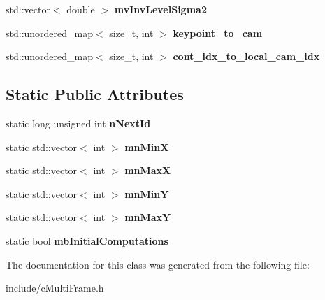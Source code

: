 \begin{DoxyCompactItemize}
\item 
std\+::vector$<$ double $>$ {\bfseries mv\+Inv\+Level\+Sigma2}\hypertarget{classMultiColSLAM_1_1cMultiFrame_a0efae885316c74805aff13ad2917cdb3}{}\label{classMultiColSLAM_1_1cMultiFrame_a0efae885316c74805aff13ad2917cdb3}

\item 
std\+::unordered\+\_\+map$<$ size\+\_\+t, int $>$ {\bfseries keypoint\+\_\+to\+\_\+cam}\hypertarget{classMultiColSLAM_1_1cMultiFrame_a85c085e693b121de5c242570b51f59bc}{}\label{classMultiColSLAM_1_1cMultiFrame_a85c085e693b121de5c242570b51f59bc}

\item 
std\+::unordered\+\_\+map$<$ size\+\_\+t, int $>$ {\bfseries cont\+\_\+idx\+\_\+to\+\_\+local\+\_\+cam\+\_\+idx}\hypertarget{classMultiColSLAM_1_1cMultiFrame_acb5b3e37472d3c7151e6aea56cba76ab}{}\label{classMultiColSLAM_1_1cMultiFrame_acb5b3e37472d3c7151e6aea56cba76ab}

\end{DoxyCompactItemize}
\subsection*{Static Public Attributes}
\begin{DoxyCompactItemize}
\item 
static long unsigned int {\bfseries n\+Next\+Id}\hypertarget{classMultiColSLAM_1_1cMultiFrame_ad0edf8142af98311b46457444c76aed6}{}\label{classMultiColSLAM_1_1cMultiFrame_ad0edf8142af98311b46457444c76aed6}

\item 
static std\+::vector$<$ int $>$ {\bfseries mn\+MinX}\hypertarget{classMultiColSLAM_1_1cMultiFrame_ae6f0d6114f23f30ede6b39e729bb906a}{}\label{classMultiColSLAM_1_1cMultiFrame_ae6f0d6114f23f30ede6b39e729bb906a}

\item 
static std\+::vector$<$ int $>$ {\bfseries mn\+MaxX}\hypertarget{classMultiColSLAM_1_1cMultiFrame_a7c2ba9302fbfc0d92c1c16fc7209dd16}{}\label{classMultiColSLAM_1_1cMultiFrame_a7c2ba9302fbfc0d92c1c16fc7209dd16}

\item 
static std\+::vector$<$ int $>$ {\bfseries mn\+MinY}\hypertarget{classMultiColSLAM_1_1cMultiFrame_a63ff12a293a5224cef941d5564217e4d}{}\label{classMultiColSLAM_1_1cMultiFrame_a63ff12a293a5224cef941d5564217e4d}

\item 
static std\+::vector$<$ int $>$ {\bfseries mn\+MaxY}\hypertarget{classMultiColSLAM_1_1cMultiFrame_a2fba246c7c1925af5b35a5b8d27c7f8f}{}\label{classMultiColSLAM_1_1cMultiFrame_a2fba246c7c1925af5b35a5b8d27c7f8f}

\item 
static bool {\bfseries mb\+Initial\+Computations}\hypertarget{classMultiColSLAM_1_1cMultiFrame_a4be8a054e55e4859208f2aa217b5ea27}{}\label{classMultiColSLAM_1_1cMultiFrame_a4be8a054e55e4859208f2aa217b5ea27}

\end{DoxyCompactItemize}


The documentation for this class was generated from the following file\+:\begin{DoxyCompactItemize}
\item 
include/c\+Multi\+Frame.\+h\end{DoxyCompactItemize}
